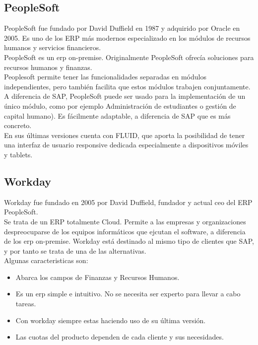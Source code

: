 \subsection{PeopleSoft}
PeopleSoft fue fundado por David Duffield en 1987 y adquirido por Oracle en 2005. Es uno de los ERP más modernos especializado en los módulos de recursos humanos y servicios financieros.\\

PeopleSoft es un \acrshort{erp} \gls{on-premise}.
Originalmente PeopleSoft ofrecía soluciones para recursos humanos y finanzas.\\

Peoplesoft permite tener las funcionalidades separadas en módulos independientes, pero también facilita que estos módulos trabajen conjuntamente.
A diferencia de SAP, PeopleSoft puede ser usado para la implementación de un único módulo, como por ejemplo Administración de estudiantes o gestión de capital humano).
Es fácilmente adaptable, a diferencia de SAP que es más concreto.\\

En sus últimas versiones cuenta con FLUID, que aporta la posibilidad de tener una interfaz de usuario responsive dedicada especialmente a dispositivos móviles y tablets.



\subsection{Workday}
Workday fue fundado en 2005 por David Duffield, fundador y actual \acrshort{ceo} del ERP PeopleSoft.\\



Se trata de un ERP totalmente Cloud. Permite a las empresas y organizaciones despreocuparse de los equipos informáticos que ejcutan el software, a diferencia de los \acrshort{erp} \gls{on-premise}.
Workday está destinado al mismo tipo de clientes que SAP, y por tanto se trata de una de las alternativas.\\

Algunas caracteristicas son:
\begin{itemize}
	\item Abarca los campos de Finanzas y Recursos Humanos.
	\item Es un \acrshort{erp} simple e intuitivo. No se necesita ser experto para llevar a cabo tareas.
	\item Con workday siempre estas haciendo uso de su última versión.
	\item Las cuotas del producto dependen de cada cliente y sus necesidades.
\end{itemize}


